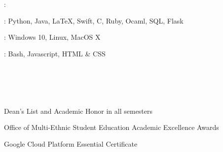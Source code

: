 \documentclass{resume}
\newif\ifen
\newif\ifzh
\newif\ifboth
\newcommand{\en}[1]{\ifen#1\fi}
\newcommand{\zh}[1]{\ifzh#1\fi}
\newcommand{\both}[1]{\ifboth#1\fi}
\begin{document}
    \en{\subsection{Financial Record Keeping App}}
    \zh{\subsection{个人记账App}}
    \en{
        \begin{ind} 
            For \textbf{Programming Handheld System} course taken in University of Maryland.
        \end{ind}
    }
    \zh{
        \begin{ind}
            马里兰大学\textbf{iOS编程}课程大作业。
        \end{ind}
    }
    \en{
        \begin{jobitemize}
            \item Created using latest SwiftUI framework
            \item A simplified bookkeeping app that stores everything locally
            \item Designed with payment remainder and transaction tagging system
        \end{jobitemize}
    }
    \zh{
        \begin{jobitemize}
            \item 基于最新的SwiftUI框架
            \item 完全本地化的个人记账app
            \item 具有账单体系与交易记录功能，可对交易进行拍照、加tag等进行分类
        \end{jobitemize}
    }

    \section{\faCogs\ \en{Skills}\both{ }\zh{技能}}
    \begin{myitemize}
        \item \en{Languages}\both{ }\zh{语言}: \en{English - Proficient, Chinese - Native}
        \item \en{Programming Languages}\both{ }\zh{编程语言}: Python, Java, \LaTeX, Swift, C, Ruby, Ocaml, SQL, Flask
        \item \en{Platform}\both{ }\zh{平台}: Windows 10, Linux, MacOS X
        \item \en{Others}\both{ }\zh{其他}: Bash, Javascript, HTML \& CSS
    \end{myitemize}

    \section{\faCertificate\ \en{Honors \& Certificates}\both{ }\zh{荣誉与证书}}
    \begin{myitemize}
        \item Dean's List and Academic Honor in all semesters
        \item Office of Multi-Ethnic Student Education Academic Excellence Awards
        \item Google Cloud Platform Essential Certificate
    \end{myitemize}
\end{document}
